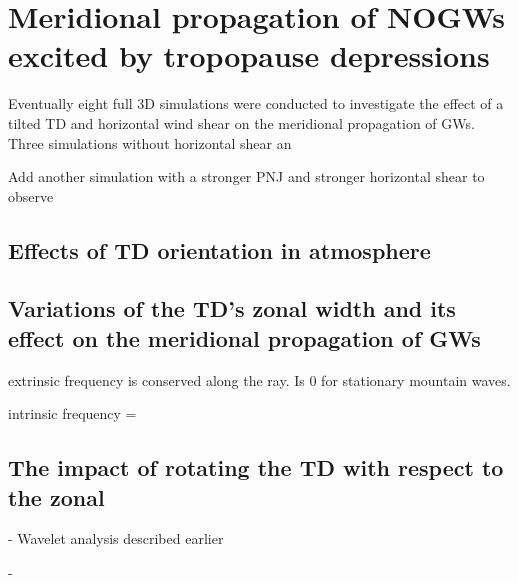 \chapter{Meridional propagation of NOGWs excited by tropopause depressions}
\label{sec:results3D}

Eventually eight full 3D simulations were conducted to investigate the effect of a tilted TD and horizontal wind shear on the meridional propagation of GWs.
Three simulations without horizontal shear an


Add another simulation with a stronger PNJ and stronger horizontal shear to observe 
\section{Effects of TD orientation in atmosphere}


\section{Variations of the TD's zonal width and its effect on the meridional propagation of GWs}

extrinsic frequency is conserved along the ray. Is 0 for stationary mountain waves.

intrinsic frequency = 




\section{The impact of rotating the TD with respect to the zonal}

- Wavelet analysis described earlier

- 

